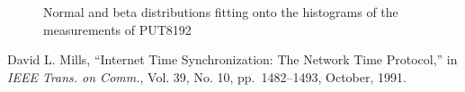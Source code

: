 \documentclass[10pt]{article}
\begin{document}
\begin{figure}[H]
	\centering
	\caption{Normal and beta distributions fitting onto the histograms of the measurements of PUT8192~\label{fig:extra_pt_hist8}}
\end{figure}


\newcommand{\etalchar}[1]{$^{#1}$}
\begin{thebibliography}{99}
 David L. Mills, ``Internet Time Synchronization: The Network Time Protocol,'' in {\it IEEE Trans. on Comm.}, Vol. 39, No. 10, pp.~1482--1493, October, 1991.
\end{thebibliography}
\end{document}
